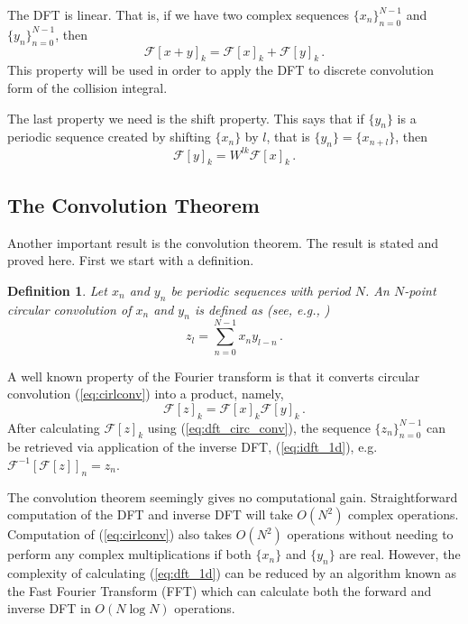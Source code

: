 \documentclass[12pt]{CSUNthesis}
\newtheorem{definition}{Definition}
\def\calF{\mathcal{F}}
\begin{document}
The DFT is linear. That is, if we have two complex sequences $\{x_n\}_{n=0}^{N-1}$ and $\{y_n\}_{n=0}^{N-1}$, then 
\begin{equation}
\label{eq:dft_lin}
\calF[x+y]_k = \calF[x]_k + \calF[y]_k\, .
\end{equation}
This property will be used in order to apply the DFT to discrete convolution form of the collision integral.

The last property we need is the shift property. This says that if $\{y_n\}$ is a periodic sequence created by shifting $\{x_n\}$ by $l$, that is $\{y_n\} = \{x_{n+l}\}$, then
\begin{equation}
\label{eq:shift_prop}
\calF[y]_k = W^{lk}\calF[x]_k\, .
\end{equation}

\subsection{The Convolution Theorem}
Another important result is the convolution theorem. The result is stated and proved here. First we start with a definition.
\begin{definition}
Let $x_{n}$ and $y_{n}$ be periodic sequences with period $N$. An $N$-point circular 
convolution of $x_{n}$ and $y_{n}$ is defined as (see, e.g., \cite{Nussbaumer1982})
\begin{equation}
\label{eq:cirlconv}
z_{l}=\sum_{n=0}^{N-1} x_{n}y_{l-n}\, .
\end{equation} 
\end{definition}
A well known property of the Fourier transform is that it converts circular 
convolution (\ref{eq:cirlconv}) into a product, namely, 
\begin{equation}
\label{eq:dft_circ_conv}
\calF[z]_{k}=\calF[x]_{k}\calF[y]_{k}\, .
\end{equation}
After calculating $\calF[z]_k$ using (\ref{eq:dft_circ_conv}), the sequence $\{z_n\}_{n=0}^{N-1}$ can be retrieved via application of the inverse DFT, (\ref{eq:idft_1d}), e.g. $\calF^{-1}[\calF[z]]_n = z_n$. 

The convolution theorem seemingly gives no computational gain. Straightforward computation of the DFT and inverse DFT will take $O(N^2)$ complex operations. Computation of (\ref{eq:cirlconv}) also takes $O(N^2)$ operations without needing to perform any complex multiplications if both $\{x_n\}$ and $\{y_n\}$ are real. However, the complexity of calculating (\ref{eq:dft_1d}) can be reduced by an algorithm known as the Fast Fourier Transform (FFT) which can calculate both the forward and inverse DFT in $O(N \log N)$ operations.
\end{document}
